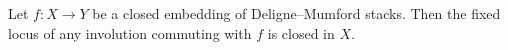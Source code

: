 \begin{proposition}\label{Man12-prop-3.2}
Let $f\colon X\to Y$ be a closed embedding of Deligne--Mumford stacks. Then the fixed locus of any involution commuting with $f$ is closed in $X$.
\end{proposition}